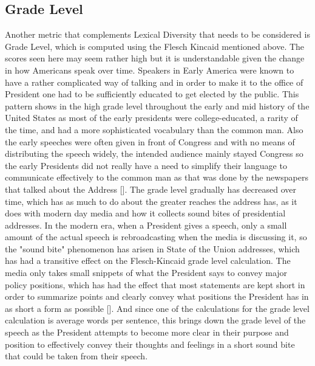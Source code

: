 \subsection{Grade Level}
Another metric that complements Lexical Diversity that needs to be considered is Grade Level, which is computed using the Flesch Kincaid mentioned above.
The scores seen here may seem rather high but it is understandable given the change in how Americans speak over time.
Speakers in Early America were known to have a rather complicated way of talking and in order to make it to the office of President one had to be sufficiently educated to get elected by the public.
This pattern shows in the high grade level throughout the early and mid history of the United States as most of the early presidents were college-educated, a rarity of the time, and had a more sophisticated vocabulary than the common man.
Also the early speeches were often given in front of Congress and with no means of distributing the speech widely, the intended audience mainly stayed Congress so the early Presidents did not really have a need to simplify their language to communicate effectively to the common man as that was done by the newspapers that talked about the Address [\cite{ziff1991writing}].
The grade level gradually has decreased over time, which has as much to do about the greater reaches the address has, as it does with modern day media and how it collects sound bites of presidential addresses.
In the modern era, when a President gives a speech, only a small amount of the actual speech is rebroadcasting when the media is discussing it, so the "sound bite" phenomenon has arisen in State of the Union addresses, which has had a transitive effect on the Flesch-Kincaid grade level calculation.
The media only takes small snippets of what the President says to convey major policy positions, which has had the effect that most statements are kept short in order to summarize points and clearly convey what positions the President has in as short a form as possible [\cite{paletz1977presidents}].
And since one of the calculations for the grade level calculation is average words per sentence, this brings down the grade level of the speech as the President attempts to become more clear in their purpose and position to effectively convey their thoughts and feelings in a short sound bite that could be taken from their speech.